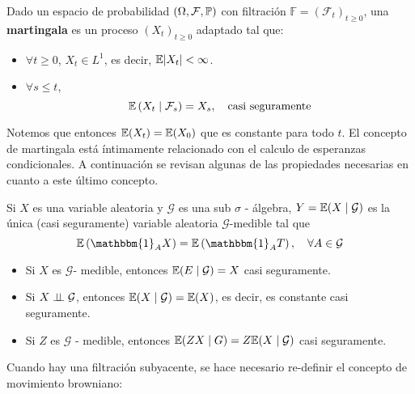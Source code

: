 \begin{definition}[Martingala]
        Dado un espacio de probabilidad $(\Omega, \mathcal{F}, \P)$ con
        filtración $\mathbb{F} = (\mathcal{F}_{t})_{t \geq 0}$, una \textbf{martingala} es un proceso 
        $(X_t)_{t \geq 0}$ adaptado tal que:

        \begin{itemize}
                \item $\forall  t \geq 0$, $X_t \in L^{1}$, es decir, $\E \abs{X_t} < \infty$.
                \item $\forall s \leq t$, 
                        \begin{equation*}
                                \E \left( X_t \mid \mathcal{F}_s \right)  = X_s, ~ ~ ~ \text{casi seguramente}
                        \end{equation*}
        \end{itemize}
\end{definition}

Notemos que entonces $\E(X_t) = \E(X_0)$ que es constante para todo $t$. El concepto de martingala está 
íntimamente relacionado con el calculo de esperanzas condicionales. A continuación se revisan algunas 
de las propiedades  necesarias en cuanto a este último concepto. 

\newp Si $X$ es una variable aleatoria y $\mathcal{G}$ es una sub $\sigma$ - álgebra, $Y = \E(X \mid \mathcal{G})$ 
es la única (casi seguramente) variable aleatoria $\mathcal{G}$-medible tal que 
\begin{equation*}
\E \left( \mathbbm{1}_{A} X  \right)  = \E\left( \mathbbm{1}_{A} T \right) , ~ ~ ~\forall  A \in \mathcal{G}
\end{equation*}

\begin{itemize}
        \item Si $X$ es $\mathcal{G}$- medible, entonces $\E(E \mid \mathcal{G} ) = X$ casi seguramente.
        \item Si $X \indep \mathcal{G}$, entonces $\E(X \mid \mathcal{G}) =
                \E (X)$, es decir, es constante casi seguramente.
        \item Si $Z$ es $\mathcal{G}$ - medible, entonces $\E(ZX \mid G) = Z\E(X \mid \mathcal{G})$ casi 
                seguramente.
\end{itemize}

Cuando hay una filtración subyacente, se hace necesario re-definir el concepto de movimiento browniano:

